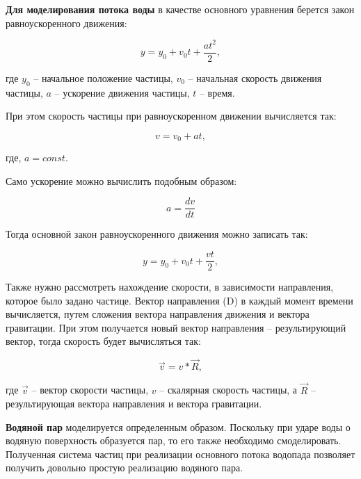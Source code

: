 \textbf{Для моделирования потока воды} в качестве основного уравнения берется закон равноускоренного движения:

\begin{equation}
    y = y_0 + v_0 t + \frac{a t^2}{2},
\end{equation}

где $y_0$ -- начальное положение частицы, $v_0$ -- начальная скорость движения частицы, $a$ -- ускорение движения частицы, $t$ -- время.



При этом скорость частицы при равноускоренном движении вычисляется так:

\begin{equation}
    v = v_0 + a t,
\end{equation}

где, $a = const$.

Само ускорение можно вычислить подобным образом:

\begin{equation}
    a = \frac{dv}{dt}
\end{equation}

Тогда основной закон равноускоренного движения можно записать так:

\begin{equation}
    y = y_0 + v_0 t + \frac{v t}{2},
\end{equation}


Также нужно рассмотреть нахождение скорости, в зависимости направления, которое было задано частице. Вектор направления (D) в каждый момент времени вычисляется, путем сложения вектора направления движения и вектора гравитации. При этом получается новый вектор направления -- результирующий вектор, тогда скорость будет вычисляться так:

\begin{equation}
    \vec{v} = v * \vec{R},
\end{equation}

где $\vec{v}$ -- вектор скорости частицы, $v$ -- скалярная скорость частицы, а $\vec{R}$ -- результирующая вектора направления и вектора гравитации.


\textbf{Водяной пар} моделируется определенным образом. Поскольку при ударе воды о водяную поверхность образуется пар, то его также необходимо смоделировать. Полученная система частиц при реализации основного потока водопада позволяет получить довольно простую реализацию водяного пара.

